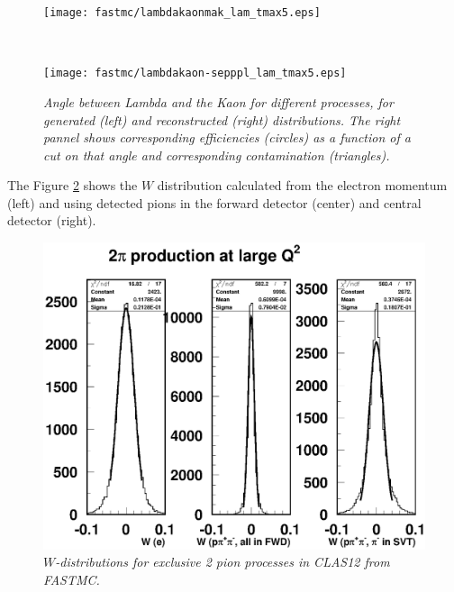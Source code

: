 \begin{figure}[htb]
\begin{minipage}[b]{6.0cm}
\texttt{[image: fastmc/lambdakaonmak\_lam\_tmax5.eps]}
\end{minipage}
    \ \hspace{0mm} \hspace{0mm} \
\begin{minipage}[b]{6.0cm}
\texttt{[image: fastmc/lambdakaon-sepppl\_lam\_tmax5.eps]}
\end{minipage}
\caption{\it Angle between Lambda and the Kaon for different processes, for generated (left) and reconstructed (right) distributions. The right pannel shows corresponding efficiencies  (circles)
as a function of a cut on that angle and corresponding contamination (triangles).
}
\label{fig:KLam}
\end{figure}

The Figure \ref{fig:twopi} shows the $W$ distribution calculated from the electron 
momentum (left) and using detected pions in the forward detector (center) and central
detector (right). 

\begin{figure}[htb]
\includegraphics[width=6in]{fastmc/twopi.eps}
\caption{\it $W$-distributions for exclusive 2 pion processes in CLAS12 from FASTMC.}
\label{fig:twopi}
\end{figure}



